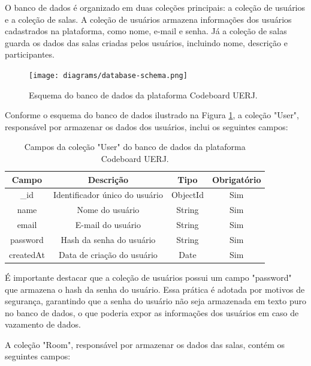 O banco de dados é organizado em duas coleções principais: a coleção de usuários e a coleção de salas. A coleção de usuários armazena informações dos usuários cadastrados na plataforma, como nome, e-mail e senha. Já a coleção de salas guarda os dados das salas criadas pelos usuários, incluindo nome, descrição e participantes.

\begin{figure}[H]
    \centering
    \texttt{[image: diagrams/database-schema.png]}
    \caption{Esquema do banco de dados da plataforma Codeboard UERJ.}
    \label{fig:database-schema}
\end{figure}

Conforme o esquema do banco de dados ilustrado na Figura \ref{fig:database-schema}, a coleção "User", responsável por armazenar os dados dos usuários, inclui os seguintes campos:

\begin{table}[H]
    \centering
    \begin{tabular}{|c|c|c|c|}
        \hline
        \textbf{Campo} & \textbf{Descrição}             & \textbf{Tipo} & \textbf{Obrigatório} \\
        \hline
        \_id           & Identificador único do usuário & ObjectId      & Sim                  \\
        name           & Nome do usuário                & String        & Sim                  \\
        email          & E-mail do usuário              & String        & Sim                  \\
        password       & Hash da senha do usuário       & String        & Sim                  \\
        createdAt      & Data de criação do usuário     & Date          & Sim                  \\
        \hline
    \end{tabular}
    \caption{Campos da coleção "User" do banco de dados da plataforma Codeboard UERJ.}
    \label{tab:user-collection-fields}
\end{table}

É importante destacar que a coleção de usuários possui um campo "password" que armazena o hash da senha do usuário. Essa prática é adotada por motivos de segurança, garantindo que a senha do usuário não seja armazenada em texto puro no banco de dados, o que poderia expor as informações dos usuários em caso de vazamento de dados.

A coleção "Room", responsável por armazenar os dados das salas, contém os seguintes campos:

